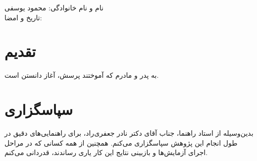 \documentclass[12pt,a4paper,oneside]{report}
\theoremstyle{definition}
\theoremstyle{plain}
\begin{document}
\begin{flushleft}
  نام و نام خانوادگی: محمود یوسفی \\[0.3cm]
  تاریخ و امضا: \lr{\dots\dots\dots\dots\dots}
\end{flushleft}
\clearpage

\chapter*{تقدیم}
\vspace*{2cm}
\begin{center}
به پدر و مادرم که آموختند پرسش، آغاز دانستن است.
\end{center}
\clearpage

\chapter*{سپاسگزاری}
بدین‌وسیله از استاد راهنما، جناب آقای دکتر نادر جعفری‌راد، برای راهنمایی‌های
دقیق در طول انجام این پژوهش سپاسگزاری می‌کنم. همچنین از همه کسانی که در
مراحل اجرای آزمایش‌ها و بازبینی نتایج این کار یاری رساندند، قدردانی می‌کنم.
\clearpage
\end{document}
